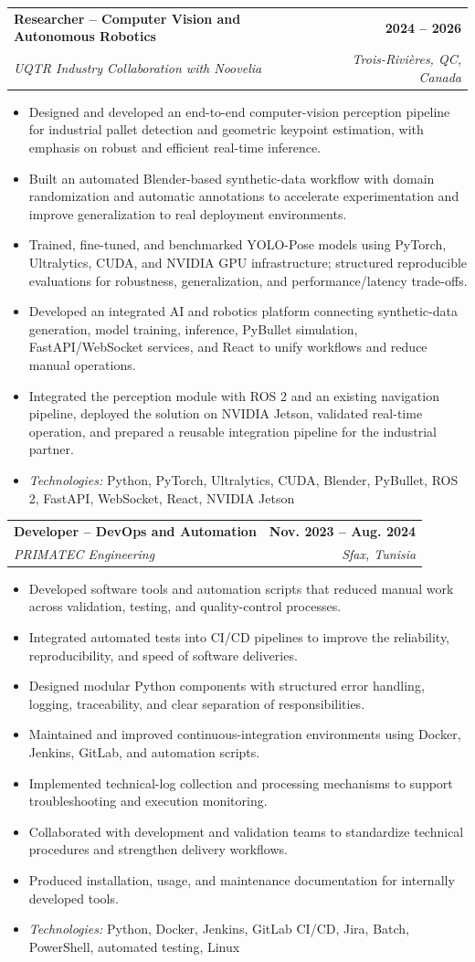 \documentclass[a4paper,10pt]{article}
\makeatletter
\newcommand{\resumeItem}[1]{
  \item\small{{#1 \vspace{-1pt}}}
}
\newcommand{\resumeSubheading}[4]{
  \vspace{0pt}\item
    \begin{tabular*}{1.0\textwidth}[t]{l@{\extracolsep{\fill}}r}
      \textbf{#1} & \textbf{\small #2} \\
      \textit{\small #3} & \textit{\small #4} \\
    \end{tabular*}\vspace{2.5pt}
}
\newcommand{\resumeItemListStart}{
  \begin{itemize}[
    leftmargin=0.18in,
    itemsep=0.8pt,
    topsep=2pt,
    parsep=0pt,
    partopsep=0pt
  ]
}
\newcommand{\resumeItemListEnd}{
  \end{itemize}\vspace{1.5pt}
}
\makeatother
\begin{document}
  \resumeSubheading
    {Researcher -- Computer Vision and Autonomous Robotics}{2024 -- 2026}
    {UQTR \textbar{} Industry Collaboration with Noovelia}{Trois-Rivières, QC, Canada}
    \resumeItemListStart
      \resumeItem{Designed and developed an end-to-end computer-vision perception pipeline for industrial pallet detection and geometric keypoint estimation, with emphasis on robust and efficient real-time inference.}
      \resumeItem{Built an automated Blender-based synthetic-data workflow with domain randomization and automatic annotations to accelerate experimentation and improve generalization to real deployment environments.}
      \resumeItem{Trained, fine-tuned, and benchmarked YOLO-Pose models using PyTorch, Ultralytics, CUDA, and NVIDIA GPU infrastructure; structured reproducible evaluations for robustness, generalization, and performance/latency trade-offs.}
      \resumeItem{Developed an integrated AI and robotics platform connecting synthetic-data generation, model training, inference, PyBullet simulation, FastAPI/WebSocket services, and React to unify workflows and reduce manual operations.}
      \resumeItem{Integrated the perception module with ROS 2 and an existing navigation pipeline, deployed the solution on NVIDIA Jetson, validated real-time operation, and prepared a reusable integration pipeline for the industrial partner.}
      \resumeItem{\textit{Technologies:} Python, PyTorch, Ultralytics, CUDA, Blender, PyBullet, ROS 2, FastAPI, WebSocket, React, NVIDIA Jetson}
    \resumeItemListEnd
    \vspace{7pt}

  \resumeSubheading
    {Developer -- DevOps and Automation}{Nov. 2023 -- Aug. 2024}
    {PRIMATEC Engineering}{Sfax, Tunisia}
    \resumeItemListStart
      \resumeItem{Developed software tools and automation scripts that reduced manual work across validation, testing, and quality-control processes.}
      \resumeItem{Integrated automated tests into CI/CD pipelines to improve the reliability, reproducibility, and speed of software deliveries.}
      \resumeItem{Designed modular Python components with structured error handling, logging, traceability, and clear separation of responsibilities.}
      \resumeItem{Maintained and improved continuous-integration environments using Docker, Jenkins, GitLab, and automation scripts.}
      \resumeItem{Implemented technical-log collection and processing mechanisms to support troubleshooting and execution monitoring.}
      \resumeItem{Collaborated with development and validation teams to standardize technical procedures and strengthen delivery workflows.}
      \resumeItem{Produced installation, usage, and maintenance documentation for internally developed tools.}
      \resumeItem{\textit{Technologies:} Python, Docker, Jenkins, GitLab CI/CD, Jira, Batch, PowerShell, automated testing, Linux}
    \resumeItemListEnd
    \vspace{7pt}
\end{document}
